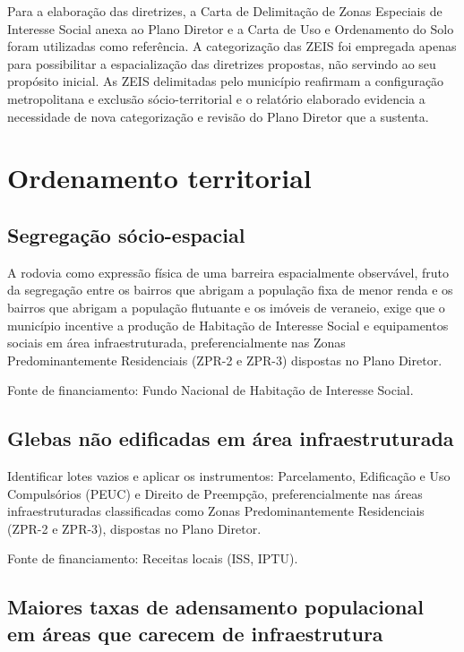 	Para a elaboração das diretrizes, a Carta de Delimitação de Zonas Especiais de Interesse Social anexa ao Plano Diretor  e a Carta de Uso e Ordenamento do Solo foram utilizadas como referência. A categorização das ZEIS foi empregada apenas para possibilitar a espacialização das diretrizes propostas, não servindo ao seu propósito inicial. As ZEIS delimitadas pelo município reafirmam a configuração metropolitana e exclusão sócio-territorial e o relatório elaborado evidencia a necessidade de nova categorização e revisão do Plano Diretor que a sustenta. 

	\section{Ordenamento territorial}
	
	\subsection{Segregação sócio-espacial}
	
	A rodovia como expressão física de uma barreira espacialmente observável, fruto da segregação entre os bairros que abrigam a população fixa de menor renda e os bairros que abrigam a população flutuante e os imóveis de veraneio, exige que o município incentive a produção de Habitação de Interesse Social e equipamentos sociais em área infraestruturada, preferencialmente nas Zonas Predominantemente Residenciais (ZPR-2 e ZPR-3) dispostas no Plano Diretor.
    
    Fonte de financiamento: Fundo Nacional de Habitação de Interesse Social.
	
	\subsection{Glebas não edificadas em área infraestruturada}
	
	Identificar lotes vazios e aplicar os instrumentos: Parcelamento, Edificação e Uso Compulsórios (PEUC) e Direito de Preempção, preferencialmente nas áreas infraestruturadas classificadas como Zonas Predominantemente Residenciais (ZPR-2 e ZPR-3), dispostas no Plano Diretor.
    
    Fonte de financiamento: Receitas locais (ISS, IPTU).
	
	\subsection{Maiores taxas de adensamento populacional em áreas que carecem de infraestrutura}
	
